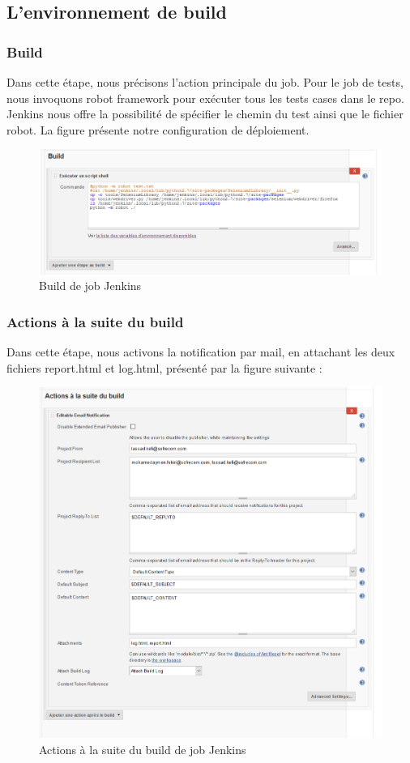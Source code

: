 \subsection{L’environnement de build}
\subsubsection{Build}
Dans cette étape, nous précisons l’action principale du job. Pour le job de tests, nous invoquons robot framework pour exécuter tous les tests cases dans le repo. Jenkins nous offre la possibilité de spécifier le chemin du test ainsi que le fichier robot. La figure présente notre configuration de déploiement.
\begin{figure}[H]
	\centering
	\includegraphics[width=0.8\linewidth]{img/jenkins/build}
	\caption[Build de job Jenkins]{Build de job Jenkins}
	\label{fig:build}
\end{figure}

\subsubsection{Actions à la suite du build}
Dans cette étape, nous activons la notification par mail, en attachant les  deux fichiers report.html et log.html, présenté par la figure suivante :
\begin{figure}[H]
	\centering
	\includegraphics[width=1\linewidth]{"img/jenkins/actions after"}
	\caption[Actions à la suite du build de job Jenkins]{Actions à la suite du build de job Jenkins}
	\label{fig:actions-after}
\end{figure}
\newpage

